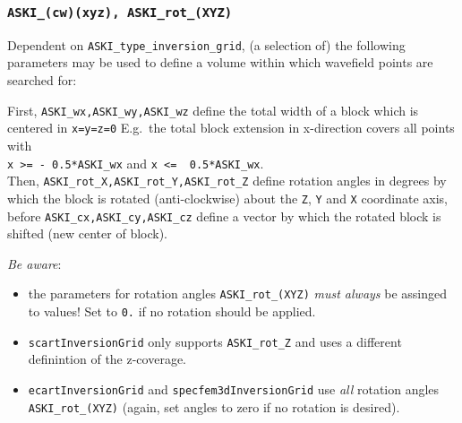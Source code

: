 \documentclass[12pt,a4paper]{article}
\newcommand{\lcode}[1]{\nolinkurl{#1}}
\begin{document}
\subsubsection*{\lcode{ASKI_(cw)(xyz), ASKI_rot_(XYZ)}}
Dependent on \lcode{ASKI_type_inversion_grid}, (a selection of) the following parameters may be used to define a volume 
within which wavefield points are searched for:

First, \lcode{ASKI_wx,ASKI_wy,ASKI_wz} define the total width of a block which is centered in \lcode{x=y=z=0}
E.g.\ the total block extension in x-direction covers all points with\\
\lcode{x >= - 0.5*ASKI_wx} and \lcode{x <=  0.5*ASKI_wx}.\\
Then, \lcode{ASKI_rot_X,ASKI_rot_Y,ASKI_rot_Z} define rotation angles in degrees by which the block is 
rotated (anti-clockwise) about the \lcode{Z}, \lcode{Y} and \lcode{X} coordinate axis, before 
\lcode{ASKI_cx,ASKI_cy,ASKI_cz} define a vector by which the rotated block is shifted (new center of block).

\emph{Be aware}:
\begin{itemize}
\item the parameters for rotation angles \lcode{ASKI_rot_(XYZ)} \emph{must always} be assinged to values! 
  Set to \lcode{0.} if no rotation should be applied.
\item \lcode{scartInversionGrid} only supports \lcode{ASKI_rot_Z} and uses a different definintion of the z-coverage.
\item \lcode{ecartInversionGrid} and \lcode{specfem3dInversionGrid} use \emph{all} rotation angles \lcode{ASKI_rot_(XYZ)} 
(again, set angles to zero if no rotation is desired).
\end{itemize}
%


\newpage

%
\end{document}
